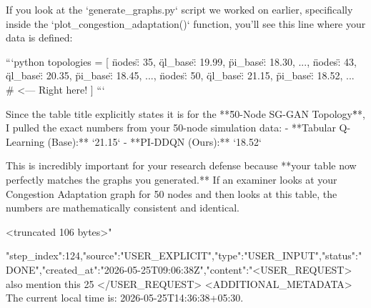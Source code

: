 \begin{table}[t]
{\begin{table}[t]
{{{{{{{{{{{If you look at the `generate_graphs.py` script we worked on earlier, specifically inside the `plot_congestion_adaptation()` function, you'll see this line where your data is defined:

```python
topologies = [
    {\"nodes\": 35, \"ql_base\": 19.99, \"pi_base\": 18.30, ...},
    {\"nodes\": 43, \"ql_base\": 20.35, \"pi_base\": 18.45, ...},
    {\"nodes\": 50, \"ql_base\": 21.15, \"pi_base\": 18.52, ...} # <--- Right here!
]
```

Since the table title explicitly states it is for the **\"50-Node SG-GAN Topology\"**, I pulled the exact numbers from your 50-node simulation data:
- **Tabular Q-Learning (Base):** `21.15`
- **PI-DDQN (Ours):** `18.52`

This is incredibly important for your research defense because **your table now perfectly matches the graphs you generated.** If an examiner looks at your Congestion Adaptation graph for 50 nodes and then looks at this table, the numbers are mathematically consistent and identical. 

<truncated 106 bytes>"}
{"step_index":124,"source":"USER_EXPLICIT","type":"USER_INPUT","status":"DONE","created_at":"2026-05-25T09:06:38Z","content":"<USER_REQUEST>
also mention this 25 %
</USER_REQUEST>
<ADDITIONAL_METADATA>
The current local time is: 2026-05-25T14:36:38+05:30.

}}}}}}}}}}}
\end{table}}
\end{table}
